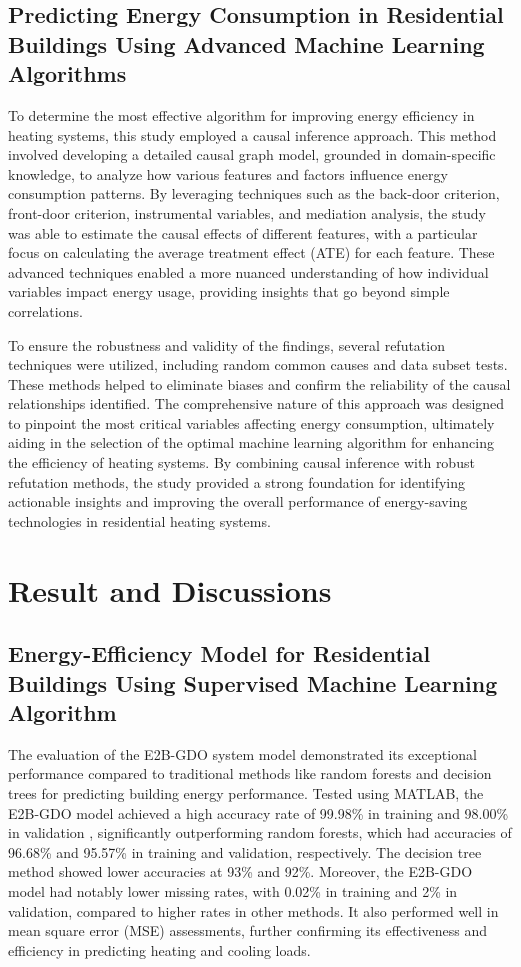 \documentclass[a4paper, 12pt]{article}
\begin{document}
\subsection{Predicting Energy Consumption in Residential Buildings Using Advanced Machine Learning Algorithms}
\quad To determine the most effective algorithm for improving energy efficiency in heating systems, this study employed a causal inference approach. This method involved developing a detailed causal graph model, grounded in domain-specific knowledge, to analyze how various features and factors influence energy consumption patterns. By leveraging techniques such as the back-door criterion, front-door criterion, instrumental variables, and mediation analysis, the study was able to estimate the causal effects of different features, with a particular focus on calculating the average treatment effect (ATE) for each feature. These advanced techniques enabled a more nuanced understanding of how individual variables impact energy usage, providing insights that go beyond simple correlations.
\vspace{7pt}

\quad To ensure the robustness and validity of the findings, several refutation techniques were utilized, including random common causes and data subset tests. These methods helped to eliminate biases and confirm the reliability of the causal relationships identified. The comprehensive nature of this approach was designed to pinpoint the most critical variables affecting energy consumption, ultimately aiding in the selection of the optimal machine learning algorithm for enhancing the efficiency of heating systems. By combining causal inference with robust refutation methods, the study provided a strong foundation for identifying actionable insights and improving the overall performance of energy-saving technologies in residential heating systems.
\vspace{7pt}

\section{Result and Discussions}
\subsection{Energy-Efficiency Model for Residential Buildings Using Supervised Machine Learning Algorithm}
\quad The evaluation of the E2B-GDO system model demonstrated its exceptional performance compared to traditional methods like random forests and decision trees for predicting building energy performance. Tested using MATLAB, the E2B-GDO model achieved a high accuracy rate of 99.98\% in training and 98.00\% in validation \cite{Aslam21}, significantly outperforming random forests, which had accuracies of 96.68\% and 95.57\% in training and validation, respectively. The decision tree method showed lower accuracies at 93\% and 92\%. Moreover, the E2B-GDO model had notably lower missing rates, with 0.02\% in training and 2\% in validation, compared to higher rates in other methods. It also performed well in mean square error (MSE) assessments, further confirming its effectiveness and efficiency in predicting heating and cooling loads. 
\end{document}
